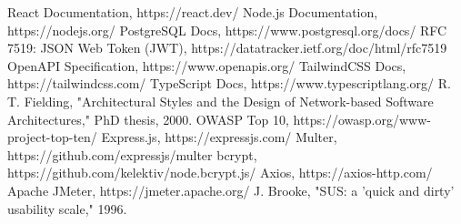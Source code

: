 \documentclass[conference]{IEEEtran}
\begin{document}
\begin{thebibliography}{00}
 React Documentation, https://react.dev/
 Node.js Documentation, https://nodejs.org/
 PostgreSQL Docs, https://www.postgresql.org/docs/
 RFC 7519: JSON Web Token (JWT), https://datatracker.ietf.org/doc/html/rfc7519
 OpenAPI Specification, https://www.openapis.org/
 TailwindCSS Docs, https://tailwindcss.com/
 TypeScript Docs, https://www.typescriptlang.org/
 R. T. Fielding, "Architectural Styles and the Design of Network-based Software Architectures," PhD thesis, 2000.
 OWASP Top 10, https://owasp.org/www-project-top-ten/
 Express.js, https://expressjs.com/
 Multer, https://github.com/expressjs/multer
 bcrypt, https://github.com/kelektiv/node.bcrypt.js/
 Axios, https://axios-http.com/
 Apache JMeter, https://jmeter.apache.org/
 J. Brooke, "SUS: a 'quick and dirty' usability scale," 1996.
\end{thebibliography}
\end{document}
